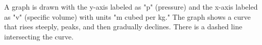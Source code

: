 A graph is drawn with the y-axis labeled as "p" (pressure) and the x-axis labeled as "v" (specific volume) with units "m cubed per kg." The graph shows a curve that rises steeply, peaks, and then gradually declines. There is a dashed line intersecting the curve.
